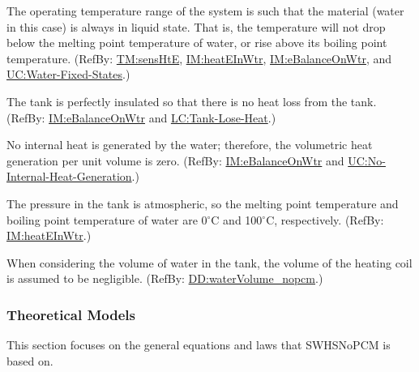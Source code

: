 \documentclass[12pt]{article}
\begin{document}
\begin{description}[font=\normalfont]
\item[Water-Always-Liquid:\phantomsection\label{assumpWAL}]{The operating temperature range of the system is such that the material (water in this case) is always in liquid state. That is, the temperature will not drop below the melting point temperature of water, or rise above its boiling point temperature. (RefBy: \hyperref[TM:sensHtE]{TM:sensHtE}, \hyperref[IM:heatEInWtr]{IM:heatEInWtr}, \hyperref[IM:eBalanceOnWtr]{IM:eBalanceOnWtr}, and \hyperref[unlikeChgWFS]{UC:Water-Fixed-States}.)}
\item[Perfect-Insulation-Tank:\phantomsection\label{assumpPIT}]{The tank is perfectly insulated so that there is no heat loss from the tank. (RefBy: \hyperref[IM:eBalanceOnWtr]{IM:eBalanceOnWtr} and \hyperref[likeChgTLH]{LC:Tank-Lose-Heat}.)}
\item[No-Internal-Heat-Generation-By-Water:\phantomsection\label{assumpNIHGBW}]{No internal heat is generated by the water; therefore, the volumetric heat generation per unit volume is zero. (RefBy: \hyperref[IM:eBalanceOnWtr]{IM:eBalanceOnWtr} and \hyperref[unlikeChgNIHG]{UC:No-Internal-Heat-Generation}.)}
\item[Atmospheric-Pressure-Tank:\phantomsection\label{assumpAPT}]{The pressure in the tank is atmospheric, so the melting point temperature and boiling point temperature of water are 0${{}^{\circ}\text{C}}$ and 100${{}^{\circ}\text{C}}$, respectively. (RefBy: \hyperref[IM:heatEInWtr]{IM:heatEInWtr}.)}
\item[Volume-Coil-Negligible:\phantomsection\label{assumpVCN}]{When considering the volume of water in the tank, the volume of the heating coil is assumed to be negligible. (RefBy: \hyperref[DD:waterVolume_nopcm]{DD:waterVolume\_nopcm}.)}
\end{description}
\subsubsection{Theoretical Models}
\label{Sec:TMs}
This section focuses on the general equations and laws that SWHSNoPCM is based on.
\end{document}
